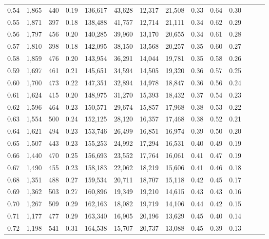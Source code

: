 \begin{tabular}{rrrrrrrrrrrrrr}
0.54 &  1,865 &  440 &  0.19 &  136,617 &   43,628 &  12,317 &  21,508 &  0.33 &  0.64 &      0.30 \\
0.55 &  1,871 &  397 &  0.18 &  138,488 &   41,757 &  12,714 &  21,111 &  0.34 &  0.62 &      0.29 \\
0.56 &  1,797 &  456 &  0.20 &  140,285 &   39,960 &  13,170 &  20,655 &  0.34 &  0.61 &      0.28 \\
0.57 &  1,810 &  398 &  0.18 &  142,095 &   38,150 &  13,568 &  20,257 &  0.35 &  0.60 &      0.27 \\
0.58 &  1,859 &  476 &  0.20 &  143,954 &   36,291 &  14,044 &  19,781 &  0.35 &  0.58 &      0.26 \\
0.59 &  1,697 &  461 &  0.21 &  145,651 &   34,594 &  14,505 &  19,320 &  0.36 &  0.57 &      0.25 \\
0.60 &  1,700 &  473 &  0.22 &  147,351 &   32,894 &  14,978 &  18,847 &  0.36 &  0.56 &      0.24 \\
0.61 &  1,624 &  415 &  0.20 &  148,975 &   31,270 &  15,393 &  18,432 &  0.37 &  0.54 &      0.23 \\
0.62 &  1,596 &  464 &  0.23 &  150,571 &   29,674 &  15,857 &  17,968 &  0.38 &  0.53 &      0.22 \\
0.63 &  1,554 &  500 &  0.24 &  152,125 &   28,120 &  16,357 &  17,468 &  0.38 &  0.52 &      0.21 \\
0.64 &  1,621 &  494 &  0.23 &  153,746 &   26,499 &  16,851 &  16,974 &  0.39 &  0.50 &      0.20 \\
0.65 &  1,507 &  443 &  0.23 &  155,253 &   24,992 &  17,294 &  16,531 &  0.40 &  0.49 &      0.19 \\
0.66 &  1,440 &  470 &  0.25 &  156,693 &   23,552 &  17,764 &  16,061 &  0.41 &  0.47 &      0.19 \\
0.67 &  1,490 &  455 &  0.23 &  158,183 &   22,062 &  18,219 &  15,606 &  0.41 &  0.46 &      0.18 \\
0.68 &  1,351 &  488 &  0.27 &  159,534 &   20,711 &  18,707 &  15,118 &  0.42 &  0.45 &      0.17 \\
0.69 &  1,362 &  503 &  0.27 &  160,896 &   19,349 &  19,210 &  14,615 &  0.43 &  0.43 &      0.16 \\
0.70 &  1,267 &  509 &  0.29 &  162,163 &   18,082 &  19,719 &  14,106 &  0.44 &  0.42 &      0.15 \\
0.71 &  1,177 &  477 &  0.29 &  163,340 &   16,905 &  20,196 &  13,629 &  0.45 &  0.40 &      0.14 \\
0.72 &  1,198 &  541 &  0.31 &  164,538 &   15,707 &  20,737 &  13,088 &  0.45 &  0.39 &      0.13 \\

\end{tabular}
